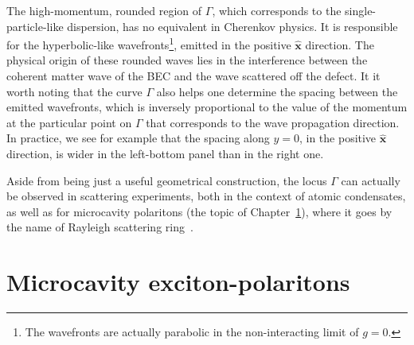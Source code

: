 The high-momentum, rounded region of $\Gamma$, which corresponds to
the single-particle-like dispersion, has no equivalent in Cherenkov
physics. It is responsible for the hyperbolic-like
wavefronts\footnote{The wavefronts are actually parabolic in the
  non-interacting limit of $g=0$.}, emitted in the positive
$\hat{\bm{x}}$ direction. The physical origin of these rounded waves
lies in the interference between the coherent matter wave of the BEC
and the wave scattered off the defect. It it worth noting that the
curve $\Gamma$ also helps one determine the spacing between the
emitted wavefronts, which is inversely proportional to the value of
the momentum at the particular point on $\Gamma$ that corresponds to
the wave propagation direction. In practice, we see for example that
the spacing along $y = 0$, in the positive $\hat{\bm{x}}$ direction,
is wider in the left-bottom panel than in the right one.

Aside from being just a useful geometrical construction, the locus
$\Gamma$ can actually be observed in scattering experiments, both in
the context of atomic condensates, as well as for microcavity
polaritons (the topic of Chapter~\ref{cha:polaritons}), where it goes
by the name of Rayleigh scattering ring~\cite{Ciuti_2005}.




\chapter{Microcavity exciton-polaritons}
\label{cha:polaritons}


